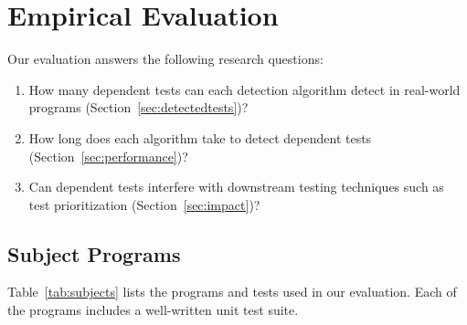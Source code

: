 \section{Empirical Evaluation}
\label{sec:evaluation}


\newcommand{\jt}{Joda-Time\xspace}

\newcommand{\jfreecharttests}{2234\xspace}%
\newcommand{\jodatimetests}{3875\xspace}
\newcommand{\xmlsecuritytests}{108\xspace}
\newcommand{\crystaltests}{75\xspace}
\newcommand{\synoptictests}{118\xspace}
\newcommand{\totaltests}{4176\xspace}

\newcommand{\jfreechartautotests}{2946\xspace}
\newcommand{\jodatimeautotests}{2639\xspace}
\newcommand{\xmlsecurityautotests}{665\xspace}
\newcommand{\crystalautotests}{3198\xspace}
\newcommand{\synopticautotests}{2467\xspace}
\newcommand{\totalautotests}{8969\xspace}




Our evaluation answers the following research questions:

\tinysqueeze


\begin{enumerate}
\tinysqueeze
\item How many dependent tests can each detection
algorithm detect in
real-world programs (Section~\ref{sec:detectedtests})?

\item How long does each algorithm take to detect dependent
tests (Section~\ref{sec:performance})?

\item Can dependent tests interfere with downstream testing techniques
such as test prioritization (Section~\ref{sec:impact})?

\end{enumerate}

\tinyrelax
\subsection{Subject Programs}


Table~\ref{tab:subjects} lists the programs and
tests used in our evaluation.
Each of the programs includes a well-written unit test suite.

